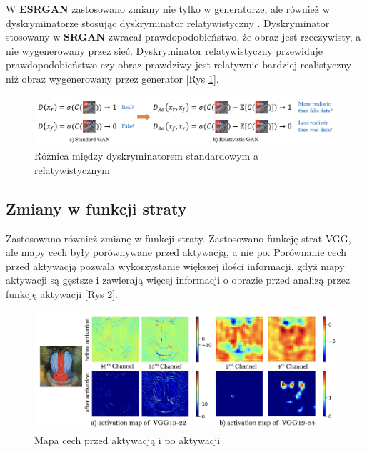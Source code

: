 W \textbf{ESRGAN} zastosowano zmiany nie tylko w generatorze, ale również w dyskryminatorze stosując dyskryminator relatywistyczny \cite{jolicoeurmartineau2018relativistic}. Dyskryminator stosowany w \textbf{SRGAN} zwracał prawdopodobieństwo, że obraz jest rzeczywisty, a nie wygenerowany przez sieć. Dyskryminator relatywistyczny przewiduje prawdopodobieństwo czy obraz prawdziwy jest relatywnie bardziej realistyczny niż obraz wygenerowany przez generator [Rys \ref{fig:image66}].

\begin{figure}[ht]
    \centering
    \begin{minipage}[t]{0.85\linewidth}
        \includegraphics[width=\linewidth]{Rozdziały/04.ESRGAN/Obrazy/relatywistyczny dyskryminator.png}
        \caption{Różnica między dyskryminatorem standardowym a relatywistycznym}
        \label{fig:image66}
    \end{minipage}
\end{figure}

\subsection*{Zmiany w funkcji straty}

Zastosowano również zmianę w funkcji straty. Zastosowano funkcję strat VGG, ale mapy cech były porównywane przed aktywacją, a nie po. Porównanie cech przed aktywacją pozwala wykorzystanie większej ilości informacji, gdyż mapy aktywacji są gęstsze i zawierają więcej informacji o obrazie przed analizą przez funkcję aktywacji [Rys \ref{fig:image65}].

\begin{figure}[ht]
    \centering
    \begin{minipage}[t]{0.85\linewidth}
        \includegraphics[width=\linewidth]{Rozdziały/04.ESRGAN/Obrazy/mapa aktywacji.png}
        \caption{Mapa cech przed aktywacją i po aktywacji}
        \label{fig:image65}
    \end{minipage}
\end{figure}



